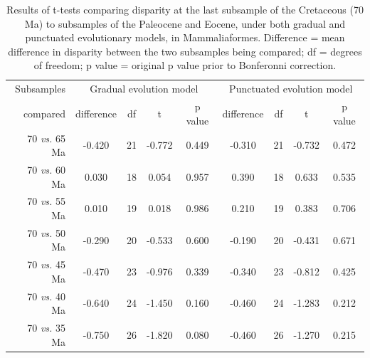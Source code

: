 \documentclass[12pt,letterpaper]{article}
\begin{document}
\begin{table}[ht]
\caption{Results of t-tests comparing disparity at the last subsample of the Cretaceous (70 Ma) to subsamples of the Paleocene and Eocene, under both gradual and punctuated evolutionary models, in Mammaliaformes. Difference = mean difference in disparity between the two subsamples being compared; df = degrees of freedom; p value = original p value prior to Bonferonni correction. }
\label{tab:Tab_slater}
\centering
\begin{tabular}{r|cccc|cccc}
  \hline
  Subsamples & \multicolumn{4}{c|}{Gradual evolution model} & \multicolumn{4}{c}{Punctuated evolution model} \\
  compared & difference & df & t & p value & difference & df & t & p value \\ 
  \hline
  70 \textit{vs.} 65 Ma & -0.420 & 21 & -0.772 & 0.449 & -0.310 & 21 & -0.732 & 0.472 \\ 
  70 \textit{vs.} 60 Ma & 0.030 & 18 & 0.054 & 0.957 & 0.390 & 18 & 0.633 & 0.535 \\ 
  70 \textit{vs.} 55 Ma & 0.010 & 19 & 0.018 & 0.986 & 0.210 & 19 & 0.383 & 0.706 \\ 
  70 \textit{vs.} 50 Ma & -0.290 & 20 & -0.533 & 0.600 & -0.190 & 20 & -0.431 & 0.671 \\ 
  70 \textit{vs.} 45 Ma & -0.470 & 23 & -0.976 & 0.339 & -0.340 & 23 & -0.812 & 0.425 \\ 
  70 \textit{vs.} 40 Ma & -0.640 & 24 & -1.450 & 0.160 & -0.460 & 24 & -1.283 & 0.212 \\ 
  70 \textit{vs.} 35 Ma & -0.750 & 26 & -1.820 & 0.080 & -0.460 & 26 & -1.270 & 0.215 \\ 
   \hline
\end{tabular}
\end{table}
\end{document}
